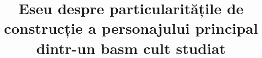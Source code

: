 

\title{Eseu despre particularitățile de construcție a personajului principal dintr-un basm cult studiat}


 \maketitle %
 

